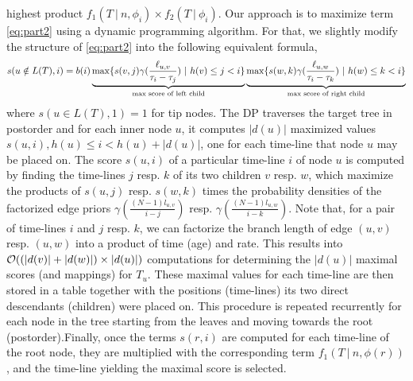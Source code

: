 \documentclass{llncs}
\begin{document}
highest product $f_1(T\ |\ n,\phi_i)\times f_2(T\ |\ \phi_i)$.%
Our approach is to maximize term \ref{eq:part2} using a dynamic programming
algorithm. For that, we slightly modify the structure of \ref{eq:part2} into
the following equivalent formula, 
%
%
\begin{equation}\label{eq:DP}
\begin{split}
s(u\notin L(T),i) = %
                    b(i)
                    \underbrace{
                        \max\{ s(v,j)\gamma(\frac{\ell_{u,v}}{\tau_i - \tau_j})\ |\ 
                          h(v) \leq j < i\}
                      }_{\textrm{max score of left child}}
                    \underbrace{
                        \max\{ s(w,k)\gamma(\frac{\ell_{u,w}}{\tau_i - \tau_k\vphantom{\tau_j}})\ |\ 
                          h(w) \leq k < i\}
                      }_{\textrm{max score of right child}}\\
\end{split}
\end{equation}
%
%
where $s(u\in L(T),1) = 1$ for tip nodes.%
%
The DP traverses the target tree in postorder and for each inner node $u$, it
computes $|d(u)|$ maximized values $s(u,i), h(u) \leq i < h(u) + |d(u)|$, one
for each time-line that node $u$ may be placed on.  The score $s(u,i)$ of a
particular time-line $i$ of node $u$ is computed by finding the time-lines $j$
resp. $k$ of its two children $v$ resp. $w$, which maximize the products of
$s(u,j)$ resp. $s(w,k)$ times the probability densities of the factorized edge
priors $\gamma(\frac{(N-1)l_{u,v}}{i-j})$ resp.
$\gamma(\frac{(N-1)l_{u,w}}{i-k})$.  Note that, for a pair of time-lines $i$
and $j$ resp. $k$, we can factorize the branch length of edge $(u,v)$ resp.
$(u,w)$ into a product of time (age) and rate.
%
%
This results into ${\cal O}((|d(v)|+|d(w)|)\times|d(u)|)$ computations for
determining the $|d(u)|$ maximal scores (and mappings) for $T_u$. These maximal
values for each time-line are then stored in a table together with the
positions (time-lines) its two direct descendants (children) were placed on.
This procedure is repeated recurrently for each node in the tree starting from
the leaves and moving towards the root (postorder).Finally, once the terms
$s(r,i)$ are computed for each time-line of the root node, they are multiplied
with the corresponding term $f_1(T\ |\ n, \phi(r))$, and the time-line yielding
the maximal score is selected.
\end{document}
